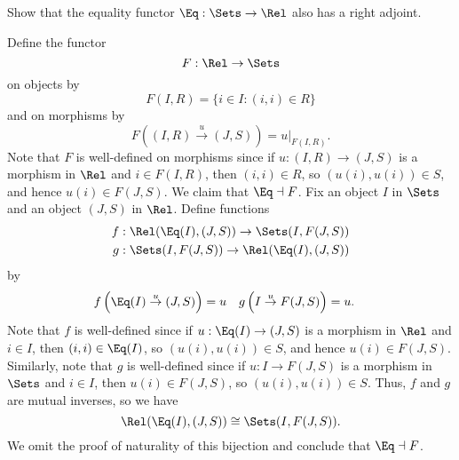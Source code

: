 \begin{exercise}
Show that the equality functor \(\Eq : \Sets \to \Rel\) also has a right adjoint.
\end{exercise}

\begin{solution}
Define the functor
\begin{equation*}
F : \Rel \to \Sets
\end{equation*}
on objects by
\begin{equation*}
F(I, R) = \{i \in I : (i, i) \in R\}
\end{equation*}
and on morphisms by
\begin{equation*}
F\left((I, R) \overset{u}{\to} (J, S)\right)
= u|_{F(I, R)}.
\end{equation*}
Note that \(F\) is well-defined on morphisms since if \(u : (I, R) \to (J, S)\) is a morphism in \(\Rel\) and \(i \in F(I, R)\), then \((i, i) \in R\), so \((u(i), u(i)) \in S\), and hence \(u(i) \in F(J, S)\).
We claim that \(\Eq \dashv F\).
Fix an object \(I\) in \(\Sets\) and an object \((J, S)\) in \(\Rel\).
Define functions
\begin{align*}
f &: \Rel(\Eq(I), (J, S)) \to \Sets(I, F(J, S)) \\
g &: \Sets(I, F(J, S)) \to \Rel(\Eq(I), (J, S))
\end{align*}
by
\begin{align*}
f\left(\Eq(I) \overset{u}{\to} (J, S)\right)
&= u &
g\left(I \overset{u}{\to} F(J, S)\right)
&= u.
\end{align*}
Note that \(f\) is well-defined since if \(u : \Eq(I) \to (J, S)\) is a morphism in \(\Rel\) and \(i \in I\), then \((i, i) \in \Eq(I)\), so \((u(i), u(i)) \in S\), and hence \(u(i) \in F(J, S)\).
Similarly, note that \(g\) is well-defined since if \(u : I \to F(J, S)\) is a morphism in \(\Sets\) and \(i \in I\), then \(u(i) \in F(J, S)\), so \((u(i), u(i)) \in S\).
Thus, \(f\) and \(g\) are mutual inverses, so we have
\begin{equation*}
\Rel(\Eq(I), (J, S)) \cong \Sets(I, F(J, S)).
\end{equation*}
We omit the proof of naturality of this bijection and conclude that \(\Eq \dashv F\).
\end{solution}